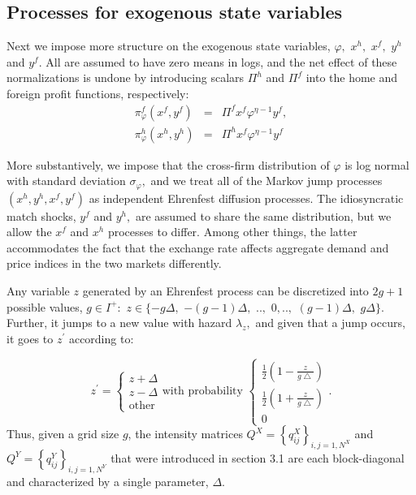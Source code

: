 \subsection{Processes for exogenous state variables}

Next we impose more structure on the exogenous state variables, $\varphi ,$ $%
x^{h},$ $x^{f},$ $y^{h}$ and $y^{f}.$ All are assumed to have zero means in
logs, and the net effect of these normalizations is undone by introducing
scalars $\Pi ^{h}$ and $\Pi ^{f}$ into the home and foreign profit
functions, respectively:%
\begin{eqnarray*}
\pi _{\varphi }^{f}(x^{f},y^{f}) &=&\Pi ^{f}x^{f}\varphi ^{\eta -1}y^{f}, \\
\pi _{\varphi }^{h}(x^{h},y^{h}) &=&\Pi ^{h}x^{f}\varphi ^{\eta -1}y^{f}
\end{eqnarray*}

More substantively, we impose that the cross-firm distribution of $\varphi $
is log normal with standard deviation $\sigma _{\varphi },$ and we treat all
of the Markov jump processes $(x^{h},y^{h},x^{f},y^{f})$ as independent
Ehrenfest diffusion processes. The idiosyncratic match shocks, $y^{f}$ and $%
y^{h},$ are assumed to share the same distribution, but we allow the $x^{f}$
and $x^{h}$ processes to differ. Among other things, the latter accommodates
the fact that the exchange rate affects aggregate demand and price indices
in the two markets differently.

Any variable $z$ generated by an Ehrenfest process can be discretized into $%
2g+1$ possible values, $g\in I^{+}:$ $z\in \{-g\Delta ,$ $-(g-1)\Delta ,$ $%
..,$ $0,..,$ $(g-1)\Delta ,$ $g\Delta \}.$ Further, it jumps to a new value
with hazard $\lambda _{z},$ and given that a jump occurs, it goes to $%
z^{\prime }$ according to:

\begin{equation*}
z^{\prime }=\left\{ 
\begin{array}{c}
z+\Delta \\ 
z-\Delta \\ 
\text{other}%
\end{array}%
\right. \text{with probability }\left\{ 
\begin{array}{c}
\frac{1}{2}\left( 1-\frac{z}{g\bigtriangleup }\right) \\ 
\frac{1}{2}\left( 1+\frac{z}{g\bigtriangleup }\right) \\ 
0%
\end{array}%
\right. .
\end{equation*}%
Thus, given a grid size $g$, the intensity matrices $Q^{X}=\left\{
q_{ij}^{X}\right\} _{i,j=1,N^{X}}$ and $Q^{Y}=\left\{ q_{ij}^{Y}\right\}
_{i,j=1,N^{Y}}$ that were introduced in section 3.1 are each block-diagonal
and characterized by a single parameter, $\Delta $.

